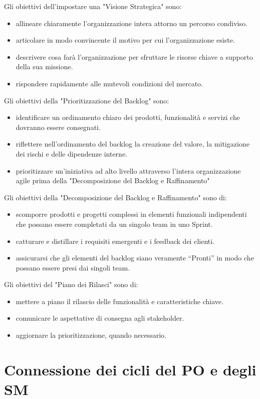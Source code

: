 \documentclass[italian,12pt,a4paper,parskip=full]{scrartcl}
\begin{document}
Gli obiettivi dell'impostare una "Visione Strategica" sono:
\begin{itemize}
\item allineare chiaramente l'organizzazione intera attorno un percorso condiviso.
\item articolare in modo convincente il motivo per cui l'organizzazione esiste.
\item descrivere cosa farà l'organizzazione per sfruttare le risorse chiave a supporto della sua missione.
\item rispondere rapidamente alle mutevoli condizioni del mercato.
\end{itemize}
Gli obiettivi della "Prioritizzazione del Backlog" sono:
\begin{itemize}
\item identificare un ordinamento chiaro dei prodotti, funzionalità e servizi che dovranno essere consegnati.
\item riflettere nell'ordinamento del backlog la creazione del valore, la mitigazione dei rischi e delle dipendenze interne.
\item prioritizzare un'iniziativa ad alto livello attraverso l'intera organizzazione agile prima della "Decomposizione del Backlog e Raffinamento"
\end{itemize}
Gli obiettivi della "Decomposizione del Backlog e Raffinamento" sono di:
\begin{itemize}
\item scomporre prodotti e progetti complessi in elementi funzionali indipendenti che possano essere completati da un singolo team in uno Sprint.
\item catturare e distillare i requisiti emergenti e i feedback dei clienti.
\item assicurarsi che gli elementi del backlog siano veramente ``Pronti'' in modo che possano essere presi dai singoli team.
\end{itemize}
Gli obiettivi del "Piano dei Rilasci" sono di:
\begin{itemize}
\item mettere a piano il rilascio delle funzionalità e caratteristiche chiave.
\item comunicare le aspettative di consegna agli stakeholder.
\item aggiornare la prioritizzazione, quando necessario.
\end{itemize}

\section{Connessione dei cicli del PO e degli SM}
\end{document}
